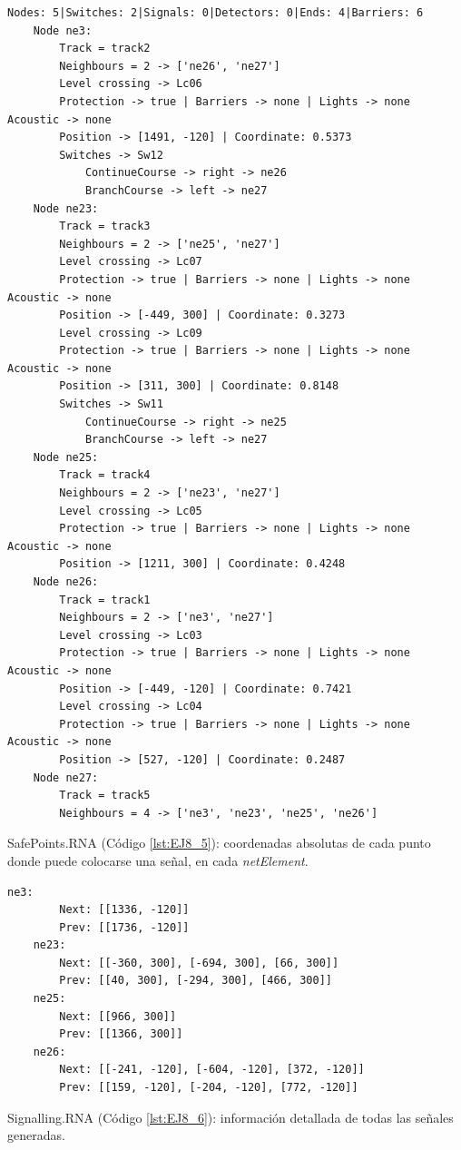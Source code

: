 	\begin{lstlisting}[language = {}, caption = Infrastructure.RNA, label = {lst:EJ8_4}]
	Nodes: 5|Switches: 2|Signals: 0|Detectors: 0|Ends: 4|Barriers: 6
	Node ne3:
		Track = track2
		Neighbours = 2 -> ['ne26', 'ne27']
		Level crossing -> Lc06
		Protection -> true | Barriers -> none | Lights -> none Acoustic -> none
		Position -> [1491, -120] | Coordinate: 0.5373
		Switches -> Sw12
			ContinueCourse -> right -> ne26
			BranchCourse -> left -> ne27
	Node ne23:
		Track = track3
		Neighbours = 2 -> ['ne25', 'ne27']
		Level crossing -> Lc07
		Protection -> true | Barriers -> none | Lights -> none Acoustic -> none
		Position -> [-449, 300] | Coordinate: 0.3273
		Level crossing -> Lc09
		Protection -> true | Barriers -> none | Lights -> none Acoustic -> none
		Position -> [311, 300] | Coordinate: 0.8148
		Switches -> Sw11
			ContinueCourse -> right -> ne25
			BranchCourse -> left -> ne27
	Node ne25:
		Track = track4
		Neighbours = 2 -> ['ne23', 'ne27']
		Level crossing -> Lc05
		Protection -> true | Barriers -> none | Lights -> none Acoustic -> none
		Position -> [1211, 300] | Coordinate: 0.4248
	Node ne26:
		Track = track1
		Neighbours = 2 -> ['ne3', 'ne27']
		Level crossing -> Lc03
		Protection -> true | Barriers -> none | Lights -> none Acoustic -> none
		Position -> [-449, -120] | Coordinate: 0.7421
		Level crossing -> Lc04
		Protection -> true | Barriers -> none | Lights -> none Acoustic -> none
		Position -> [527, -120] | Coordinate: 0.2487
	Node ne27:
		Track = track5
		Neighbours = 4 -> ['ne3', 'ne23', 'ne25', 'ne26']
	\end{lstlisting}
	
	SafePoints.RNA (Código \ref{lst:EJ8_5}): coordenadas absolutas de cada punto donde puede colocarse una señal, en cada \textit{netElement}.
	
	\begin{lstlisting}[language = {}, caption = SafePoints.RNA, label = {lst:EJ8_5}]
	ne3:
		Next: [[1336, -120]]
		Prev: [[1736, -120]]
	ne23:
		Next: [[-360, 300], [-694, 300], [66, 300]]
		Prev: [[40, 300], [-294, 300], [466, 300]]
	ne25:
		Next: [[966, 300]]
		Prev: [[1366, 300]]
	ne26:
		Next: [[-241, -120], [-604, -120], [372, -120]]
		Prev: [[159, -120], [-204, -120], [772, -120]]
	\end{lstlisting}
	
	Signalling.RNA (Código \ref{lst:EJ8_6}): información detallada de todas las señales generadas.
	

